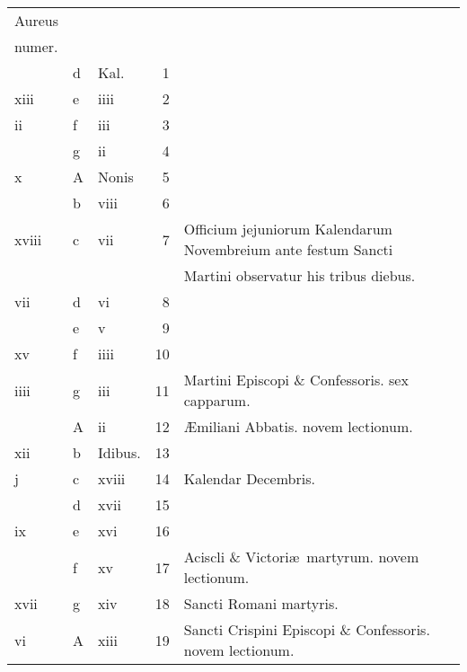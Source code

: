 \documentclass[openany]{book}
\begin{document}
\begin{center}
\begin{tabular}{l | l | l | r | l r}
\color{Red}Aureus & & & & \color{Red} \\
\color{Red}numer. & & & & \color{Red} \\
\color{Red}  & d & \color{Red} Kal. & 1 & & \color{Red} \\
\color{Red} xiii & e & \color{Red} iiii & 2 & & \color{Red} \\
\color{Red} ii & f & \color{Red} iii & 3 & & \color{Red} \\
\color{Red}  & g & \color{Red} ii & 4 & & \color{Red} \\
\color{Red} x & \color{Red} A & Nonis & 5 & & \color{Red} \\
\color{Red}  & b & \color{Red} viii & 6 & & \color{Red} \\
\color{Red} xviii & c & \color{Red} vii & 7 & Officium jejuniorum Kalendarum Novembreium ante festum Sancti & \color{Red} \\
\color{Red}  &  &  &  & \quad Martini observatur his tribus diebus. & \color{Red} \\
\color{Red} vii & d & \color{Red} vi & 8 & & \color{Red} \\
\color{Red}  & e & \color{Red} v & 9 & & \color{Red} \\
\color{Red} xv & f & \color{Red} iiii & 10 & & \color{Red} \\
\color{Red} iiii & g & \color{Red} iii & 11 & Martini Episcopi \& Confessoris. \color{Red} sex capparum. & \color{Red} \\
\color{Red}  & \color{Red} A & \color{Red} ii & 12 & \AE miliani Abbatis. \color{Red} novem lectionum. & \color{Red} \\
\color{Red} xii & b & Idibus. & 13 & & \color{Red} \\
\color{Red} j & c & \color{Red} xviii & 14 & \qquad Kalendar Decembris. & \color{Red} \\
\color{Red}  & d & \color{Red} xvii & 15 & & \color{Red} \\
\color{Red} ix & e & \color{Red} xvi & 16 & & \color{Red} \\
\color{Red}  & f & \color{Red} xv & 17 & Aciscli \& Victori\ae \ martyrum. \color{Red} novem lectionum. & \color{Red} \\
\color{Red} xvii & g & \color{Red} xiv & 18 & Sancti Romani martyris. & \color{Red} \\
\color{Red} vi & \color{Red} A & \color{Red} xiii & 19 & Sancti Crispini Episcopi \& Confessoris. \color{Red} novem lectionum. & \color{Red} \\

\end{tabular}
\end{center}
\end{document}
